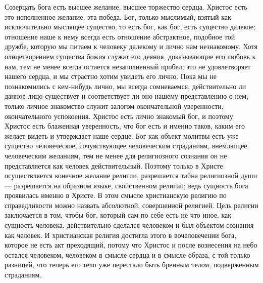\documentclass[12pt,oneside]{book}
\begin{document}
Созерцать бога есть высшее желание, высшее торжество сердца. Христос есть это исполненное желание, эта победа. Бог, только мыслимый, взятый как исключительно мыслящее существо, то есть бог, как бог, есть существо далекое; отношение наше к нему всегда есть отношение абстрактное, подобное той дружбе, которую мы питаем к человеку далекому и лично нам незнакомому. Хотя олицетворением существа божия служат его деяния, доказывающие его любовь к нам, тем не менее всегда остается незаполненный пробел; это не удовлетворяет нашего сердца, и мы страстно хотим увидеть его лично. Пока мы не познакомились с кем-нибудь лично, мы всегда сомневаемся, действительно ли данное лицо существует и соответствует ли оно нашему представлению о нем; только личное знакомство служит залогом окончательной уверенности, окончательного успокоения. Христос есть лично знакомый бог, и поэтому Христос есть блаженная уверенность, что бог есть и именно таков, каким его желает видеть и утверждает наше сердце. Бог как объект молитвы есть уже существо человеческое, сочувствующее человеческим страданиям, внемлющее человеческим желаниям, тем не менее для религиозного сознания он не представляется как человек действительный. Поэтому только в Христе осуществляется конечное желание религии, разрешается тайна религиозной души --- разрешается на образном языке, свойственном религии; ведь сущность бога проявилась именно в Христе. В этом смысле христианскую религию по справедливости можно назвать абсолютной, совершенной религией. Цель религии заключается в том, чтобы бог, который сам по себе есть не что иное, как сущность человека, действительно сделался человеком и был объектом сознания как человек. И христианская религия достигла этого в вочеловечении бога, которое не есть акт преходящий, потому что Христос и после вознесения на небо остался человеком, человеком в смысле сердца и в смысле образа, с той только разницей, что теперь его тело уже перестало быть бренным телом, подверженным страданиям.
\end{document}

